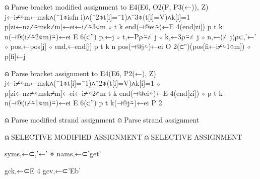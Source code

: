 \documentclass{article}%
\begin{document}
⍝ Parse bracket modified assignment to E4(E6, O2(F, P3(←)), Z)
j←i⌿⍨m←msk∧(¯1⌽isfn i)∧(¯2⌽t[i]=¯1)∧¯3⌽(t[i]=V)∧k[i]=1
p[zi←nz⌿⍨msk⌿m]←ei←i⌿⍨3⌽m ⋄ t k end(⊣@ei⍨)←E 4(end[zi])
p t k n(⊣@(i⌿⍨2⌽m)⍨)←ei E 6(⊂'')
p,←j ⋄ t,←P⍴⍨≢j ⋄ k,←3⍴⍨≢j ⋄ n,←(≢j)⍴⊂,'←' ⋄ pos,←pos[j] ⋄ end,←end[j]
p t k n pos(⊣@j⍨)←ei O 2(⊂'')(pos[fi←i⌿⍨1⌽m]) ⋄ p[fi]←j

⍝ Parse bracket assignment to E4(E6, P2(←), Z)
j←i⌿⍨m←msk∧(¯1⌽t[i]=¯1)∧¯2⌽(t[i]=V)∧k[i]=1 ⋄ p[zi←nz⌿⍨msk⌿m]←ei←i⌿⍨2⌽m
t k end(⊣@ei⍨)←E 4(end[zi]) ⋄ p t k n(⊣@(i⌿⍨1⌽m)⍨)←ei E 6(⊂'')
p t k(⊣@j⍨)←ei P 2

⍝ Parse modified strand assignment
⍝ Parse strand assignment

⍝ SELECTIVE MODIFIED ASSIGNMENT
⍝ SELECTIVE ASSIGNMENT
\nwendcode{}\nwdocspar

\nwenddocs{}\plusendmoddef\nwstartdeflinemarkup{}\nwenddeflinemarkup
syms,←⊂,'←' ⋄ nams,←⊂'get'
\nwendcode{}\nwdocspar

\nwenddocs{}\plusendmoddef\nwstartdeflinemarkup{}\nwenddeflinemarkup
gck,←⊂E 4
gcv,←⊂'Eb'
\nwendcode{}\nwdocspar
\end{document}

